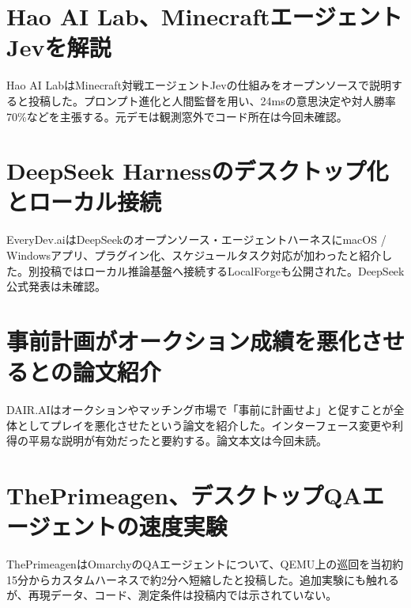 \section{Hao AI Lab、MinecraftエージェントJevを解説}
Hao AI LabはMinecraft対戦エージェントJevの仕組みをオープンソースで説明すると投稿した。プロンプト進化と人間監督を用い、24msの意思決定や対人勝率70\%などを主張する。元デモは観測窓外でコード所在は今回未確認。

\section{DeepSeek Harnessのデスクトップ化とローカル接続}
EveryDev.aiはDeepSeekのオープンソース・エージェントハーネスにmacOS / Windowsアプリ、プラグイン化、スケジュールタスク対応が加わったと紹介した。別投稿ではローカル推論基盤へ接続するLocalForgeも公開された。DeepSeek公式発表は未確認。

\section{事前計画がオークション成績を悪化させるとの論文紹介}
DAIR.AIはオークションやマッチング市場で「事前に計画せよ」と促すことが全体としてプレイを悪化させたという論文を紹介した。インターフェース変更や利得の平易な説明が有効だったと要約する。論文本文は今回未読。

\section{ThePrimeagen、デスクトップQAエージェントの速度実験}
ThePrimeagenはOmarchyのQAエージェントについて、QEMU上の巡回を当初約15分からカスタムハーネスで約2分へ短縮したと投稿した。追加実験にも触れるが、再現データ、コード、測定条件は投稿内では示されていない。
